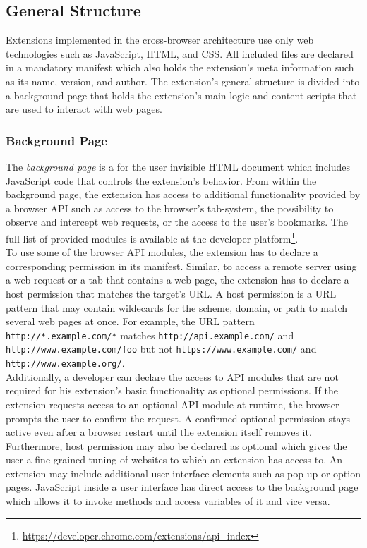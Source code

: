 \subsection{General Structure}

	Extensions implemented in the cross-browser architecture use only web technologies such as JavaScript, HTML, and CSS. All included files are declared in a mandatory manifest which also holds the extension's meta information such as its name, version, and author. The extension's general structure is divided into a background page that holds the extension's main logic and content scripts that are used to interact with web pages.
	
\subsubsection{Background Page}

	The \textit{background page} is a for the user invisible HTML document which includes JavaScript code that controls the extension's behavior. From within the background page, the extension has access to additional functionality provided by a browser API such as access to the browser's tab-system, the possibility to observe and intercept web requests, or the access to the user's bookmarks. The full list of provided modules is available at the developer platform\footnote{\url{https://developer.chrome.com/extensions/api_index}}. \\
	To use some of the browser API modules, the extension has to declare a corresponding permission in its manifest. Similar, to access a remote server using a web request or a tab that contains a web page, the extension has to declare a host permission that matches the target's URL. A host permission is a URL pattern that may contain wildecards for the scheme, domain, or path to match several web pages at once. For example, the URL pattern \texttt{http://*.example.com/*} matches \texttt{http://api.example.com/} and \texttt{http://www.example.com/foo} but not \texttt{https://www.example.com/} and \texttt{http://www.example.org/}. \\
	Additionally, a developer can declare the access to API modules that are not required for his extension's basic functionality as optional permissions. If the extension requests access to an optional API module at runtime, the browser prompts the user to confirm the request. A confirmed optional permission stays active even after a browser restart until the extension itself removes it. Furthermore, host permission may also be declared as optional which gives the user a fine-grained tuning of websites to which an extension has access to.
	An extension may include additional user interface elements such as pop-up or option pages. JavaScript inside a user interface has direct access to the background page which allows it to invoke methods and access variables of it and vice versa. 
	
